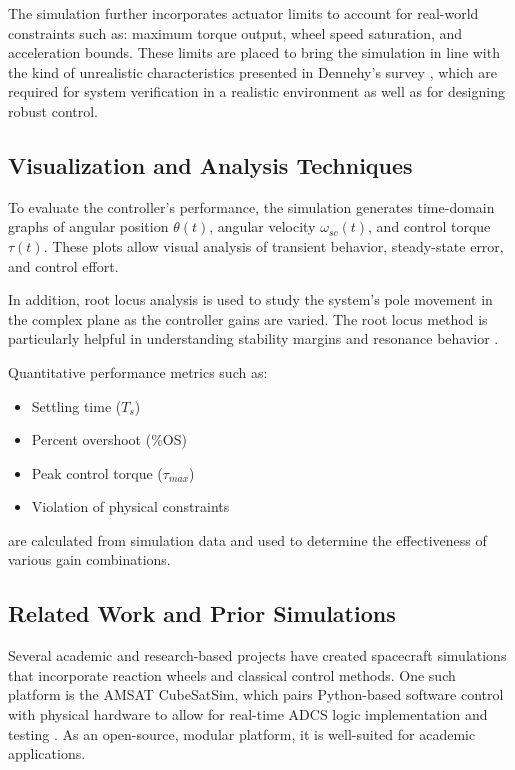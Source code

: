 \documentclass{ifacconf}
\begin{document}
The simulation further incorporates actuator limits to account for real-world constraints such as: maximum torque output, wheel speed saturation, and acceleration bounds. These limits are placed to bring the simulation in line with the kind of unrealistic characteristics presented in Dennehy's survey \citep{Dennehy2004}, which are required for system verification in a realistic environment as well as for designing robust control.

\subsection{Visualization and Analysis Techniques}

To evaluate the controller's performance, the simulation generates time-domain graphs of angular position $\theta(t)$, angular velocity $\omega_{sc}(t)$, and control torque $\tau(t)$. These plots allow visual analysis of transient behavior, steady-state error, and control effort.

In addition, root locus analysis is used to study the system’s pole movement in the complex plane as the controller gains are varied. The root locus method is particularly helpful in understanding stability margins and resonance behavior \citep{Ogata2010}.

Quantitative performance metrics such as:

\begin{itemize}
 \item Settling time ($T_s$)
 \item Percent overshoot (\%OS)
 \item Peak control torque ($\tau_{max}$)
 \item Violation of physical constraints
\end{itemize}

are calculated from simulation data and used to determine the effectiveness of various gain combinations.

\subsection{Related Work and Prior Simulations}

Several academic and research-based projects have created spacecraft simulations that incorporate reaction wheels and classical control methods. One such platform is the AMSAT CubeSatSim, which pairs Python-based software control with physical hardware to allow for real-time ADCS logic implementation and testing \citep{AMSAT2020}. As an open-source, modular platform, it is well-suited for academic applications.
\end{document}
